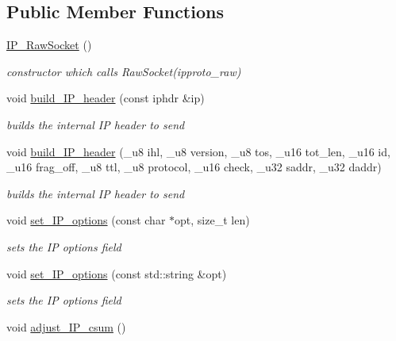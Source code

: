\subsection*{Public Member Functions}
\begin{CompactItemize}
\item 
\hypertarget{classsocketpp_1_1IP__RawSocket_e523748e7ca5bbcf7b74d804d356630e}{
\hyperlink{classsocketpp_1_1IP__RawSocket_e523748e7ca5bbcf7b74d804d356630e}{IP\_\-RawSocket} ()}
\label{classsocketpp_1_1IP__RawSocket_e523748e7ca5bbcf7b74d804d356630e}

\begin{CompactList}\small\item\em constructor which calls RawSocket(ipproto\_\-raw) \item\end{CompactList}\item 
void \hyperlink{classsocketpp_1_1IP__RawSocket_f93c51a7a8284fe9d2b24019b13a5803}{build\_\-IP\_\-header} (const iphdr \&ip)
\begin{CompactList}\small\item\em builds the internal IP header to send \item\end{CompactList}\item 
\hypertarget{classsocketpp_1_1IP__RawSocket_661a0ec3a92e7cd5582e64a3d0ed5e80}{
void \hyperlink{classsocketpp_1_1IP__RawSocket_661a0ec3a92e7cd5582e64a3d0ed5e80}{build\_\-IP\_\-header} (\_\-u8 ihl, \_\-u8 version, \_\-u8 tos, \_\-u16 tot\_\-len, \_\-u16 id, \_\-u16 frag\_\-off, \_\-u8 ttl, \_\-u8 protocol, \_\-u16 check, \_\-u32 saddr, \_\-u32 daddr)}
\label{classsocketpp_1_1IP__RawSocket_661a0ec3a92e7cd5582e64a3d0ed5e80}

\begin{CompactList}\small\item\em builds the internal IP header to send \item\end{CompactList}\item 
void \hyperlink{classsocketpp_1_1IP__RawSocket_82c0b2c75d081bc84d8e60bf18199e65}{set\_\-IP\_\-options} (const char $\ast$opt, size\_\-t len)
\begin{CompactList}\small\item\em sets the IP options field \item\end{CompactList}\item 
void \hyperlink{classsocketpp_1_1IP__RawSocket_9d88ecec5e362b3cf3d3dbc51d5dd0cd}{set\_\-IP\_\-options} (const std::string \&opt)
\begin{CompactList}\small\item\em sets the IP options field \item\end{CompactList}\item 
\hypertarget{classsocketpp_1_1IP__RawSocket_187bab79c6a8bae17b400a132063a9d1}{
void \hyperlink{classsocketpp_1_1IP__RawSocket_187bab79c6a8bae17b400a132063a9d1}{adjust\_\-IP\_\-csum} ()}
\label{classsocketpp_1_1IP__RawSocket_187bab79c6a8bae17b400a132063a9d1}


\end{CompactItemize}
